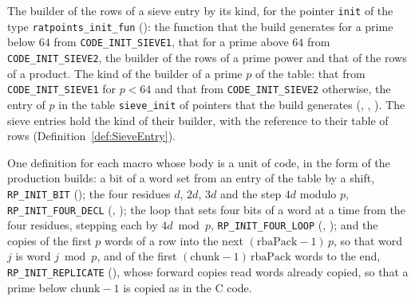 \begin{definition}\label{def:rowInit}
  \leanok
  The builder of the rows of a sieve entry by its kind, for the pointer \verb|init| of the type
  \verb|ratpoints_init_fun| (): the function that the build
  generates for a prime below $64$ from \verb|CODE_INIT_SIEVE1|, that for a prime above $64$ from
  \verb|CODE_INIT_SIEVE2|, the builder of the rows of a prime power and that of the rows of a
  product. The kind of the builder of a prime $p$ of the table: that from \verb|CODE_INIT_SIEVE1|
  for $p < 64$ and that from \verb|CODE_INIT_SIEVE2| otherwise, the entry of $p$ in the table
  \verb|sieve_init| of pointers that the build generates (,
  , ). The sieve entries hold the kind
  of their builder, with the reference to their table of rows (Definition~\ref{def:SieveEntry}).
\end{definition}

\begin{definition}\label{def:initMacros}
  \leanok
  One definition for each macro whose body is a unit of code, in the form of the production builds:
  a bit of a word set from an entry of the table by a shift, \verb|RP_INIT_BIT|
  (); the four residues $d$, $2d$, $3d$ and the step $4d$ modulo $p$,
  \verb|RP_INIT_FOUR_DECL| (, ); the loop that sets
  four bits of a word at a time from the four residues, stepping each by $4d \bmod p$,
  \verb|RP_INIT_FOUR_LOOP| (, ); and the copies of
  the first $p$ words of a row into the next $(\mathrm{rbaPack} - 1)\, p$, so that word $j$ is word
  $j \bmod p$, and of the first $(\mathrm{chunk} - 1)\,\mathrm{rbaPack}$ words to the end,
  \verb|RP_INIT_REPLICATE| (), whose forward copies read words already
  copied, so that a prime below $\mathrm{chunk} - 1$ is copied as in the C code.
\end{definition}

